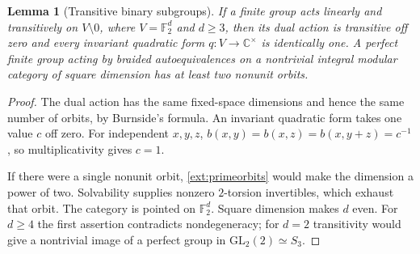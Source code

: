 \documentclass[11pt]{amsart}
\numberwithin{equation}{section}
\newtheorem{lemma}[theorem]{Lemma}
\theoremstyle{definition}
\theoremstyle{plain}
\begin{document}
\begin{lemma}[Transitive binary subgroups]\label{ext:binary-reductions}
If a finite group acts linearly and transitively on
$V\setminus0$, where $V=\mathbb F_2^d$ and $d\ge3$, then its dual
action is transitive off zero and every invariant quadratic form
$q:V\to\mathbb C^\times$ is identically one. A perfect finite group acting by braided
autoequivalences on a nontrivial integral modular category of square
dimension has at least two nonunit orbits.
\end{lemma}
\begin{proof}
The dual action has the same fixed-space dimensions and hence the
same number of orbits, by Burnside's formula. An invariant quadratic
form takes one value $c$ off zero. For independent $x,y,z$,
$b(x,y)=b(x,z)=b(x,y+z)=c^{-1}$, so multiplicativity gives $c=1$.

If there were a single nonunit orbit, \eqref{ext:primeorbits} would
make the dimension a power of two. Solvability supplies nonzero
$2$-torsion invertibles, which exhaust that orbit. The category is
pointed on $\mathbb F_2^d$. Square dimension makes $d$ even. For
$d\ge4$ the first assertion contradicts nondegeneracy; for $d=2$
transitivity would give a nontrivial image of a perfect group in
$\mathrm{GL}_2(2)\simeq S_3$.
\end{proof}
\end{document}
